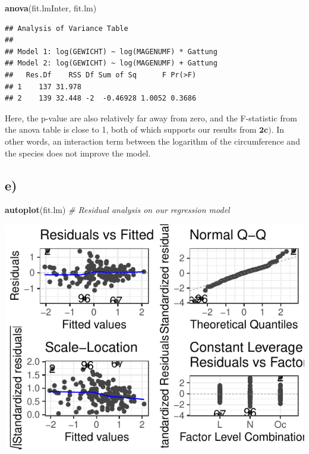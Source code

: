 \documentclass[
]{article}
\newenvironment{Shaded}{\begin{snugshade}}{\end{snugshade}}
\newcommand{\CommentTok}[1]{\textcolor[rgb]{0.56,0.35,0.01}{\textit{#1}}}
\newcommand{\KeywordTok}[1]{\textcolor[rgb]{0.13,0.29,0.53}{\textbf{#1}}}
\newcommand{\NormalTok}[1]{#1}
\begin{document}
\begin{Shaded}
\begin{Highlighting}[]
\KeywordTok{anova}\NormalTok{(fit.lmInter, fit.lm)}
\end{Highlighting}
\end{Shaded}

\begin{verbatim}
## Analysis of Variance Table
## 
## Model 1: log(GEWICHT) ~ log(MAGENUMF) * Gattung
## Model 2: log(GEWICHT) ~ log(MAGENUMF) + Gattung
##   Res.Df    RSS Df Sum of Sq      F Pr(>F)
## 1    137 31.978                           
## 2    139 32.448 -2  -0.46928 1.0052 0.3686
\end{verbatim}

Here, the p-value are also relatively far away from zero, and the
F-statistic from the anova table is close to 1, both of which supports
our results from \(\textbf{2c)}\). In other words, an interaction term
between the logarithm of the circumference and the species does not
improve the model.

\hypertarget{e-1}{%
\subsection{e)}\label{e-1}}

\begin{Shaded}
\begin{Highlighting}[]
\KeywordTok{autoplot}\NormalTok{(fit.lm)  }\CommentTok{# Residual analysis on our regression model}
\end{Highlighting}
\end{Shaded}

\includegraphics{Project_1_files/figure-latex/unnamed-chunk-7-1.pdf}
\end{document}
